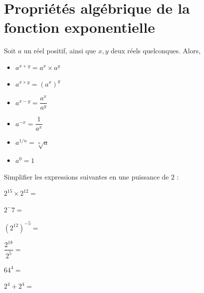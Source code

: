 \documentclass{article}
\begin{document}
\section{Propriétés algébrique de la fonction exponentielle}
\begin{tcolorbox}
\begin{proposition}
Soit $a$ un réel positif, ainsi que $x,y$ deux réels quelconques. Alors,
\begin{itemize}
\item $a^{x+y}=a^x \times a^y$
\item $a^{x \times y} = (a^x)^y$
\item $a^{x - y} = \dfrac{a^x}{a^y}$
\item $a^{-x} = \dfrac{1}{a^x}$
\item $a^{1/n} = \sqrt[n]{a}$
\item $a^0 = 1$
\end{itemize}
\end{proposition}
\end{tcolorbox}
\begin{example}
Simplifier les expressions suivantes en une puissance de $2$ :
\begin{enumquestions}
\begin{minipage}{0.45\textwidth}
\item $2^15 \times 2^12 = $ \answersline
\item $2^-7 =$ \answersline 
\item $(2^12)^{-5} =$ \answersline
\end{minipage}
\hfill
\begin{minipage}{0.45\textwidth}
\item $\dfrac{2^18}{2^5} = $ \answersline
\item $64^{4} =$ \answersline 
\item $2^4 + 2^4 =$ \answersline
\end{minipage}
\end{enumquestions}
\end{example}
\end{document}
